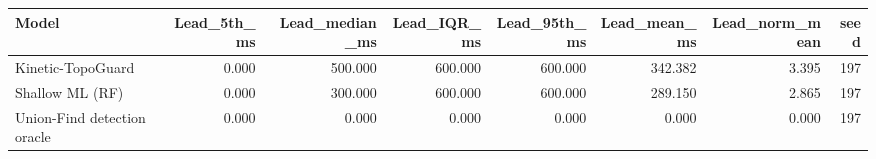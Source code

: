 \begin{tabular}{lrrrrrrr}
\toprule
Model & Lead\_5th\_ms & Lead\_median\_ms & Lead\_IQR\_ms & Lead\_95th\_ms & Lead\_mean\_ms & Lead\_norm\_mean & seed \\
\midrule
Kinetic-TopoGuard & 0.000 & 500.000 & 600.000 & 600.000 & 342.382 & 3.395 & 197 \\
Shallow ML (RF) & 0.000 & 300.000 & 600.000 & 600.000 & 289.150 & 2.865 & 197 \\
Union-Find detection oracle & 0.000 & 0.000 & 0.000 & 0.000 & 0.000 & 0.000 & 197 \\
\bottomrule
\end{tabular}